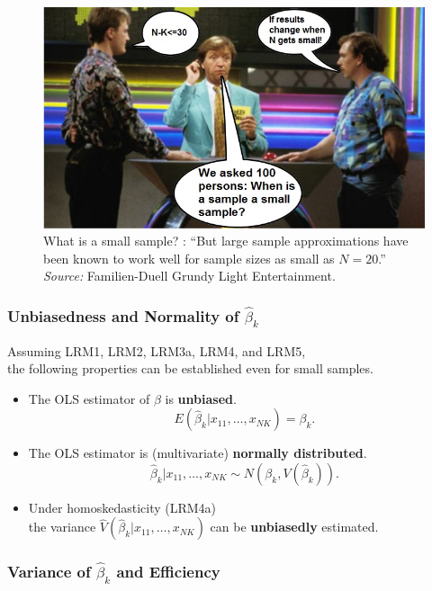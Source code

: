 \documentclass[a4paper,12pt]{article}
\def\emph{\textit}
\begin{document}
\begin{figure}[H]
	\centering
		\includegraphics[width=.9\textwidth]{figures/SmallSample}
	\caption{What is a small sample? \cite[p. 755]{Wooldridge2009}: ``But large sample approximations have been known to work well for sample sizes as small as $N = 20$.''  \emph{Source:} Familien-Duell Grundy Light Entertainment. \label{fig:SS}}
\end{figure}


\subsubsection*{Unbiasedness and Normality of $\hat{\beta}_k$}

Assuming LRM1,  LRM2,  LRM3a,  LRM4, and  LRM5,\\  the following properties can be established even for small samples.
\begin{itemize}
\item The OLS estimator of $\beta$ is \textbf{unbiased}.\\
$$E(\hat{\beta}_k|x_{11},\ldots,x_{NK})=\beta_k.$$

\item The OLS estimator is (multivariate) \textbf{normally distributed}.\\
$$\hat{\beta}_k|x_{11},\ldots,x_{NK}\sim N(\beta_k,V(\hat{\beta}_k)).$$

\item Under homoskedasticity (LRM4a)\\ the variance $\widehat{V}(\hat{\beta}_k|x_{11},\ldots,x_{NK})$ can be \textbf{unbiasedly} estimated.
\end{itemize}


\subsubsection*{Variance of $\hat{\beta}_k$ and Efficiency}
\end{document}
